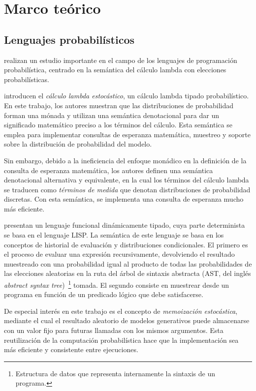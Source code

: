\chapter{Marco teórico}\label{sec:estado}

\section{Lenguajes probabilísticos}

\citet{zorzi} realizan un estudio importante en el campo de los lenguajes de programación probabilística, centrado en la semántica del cálculo lambda con elecciones probabilísticas.

\citet{slc} introducen el \emph{cálculo lambda estocástico}, un cálculo lambda tipado probabilístico. En este trabajo, los autores muestran que las distribuciones de probabilidad forman una mónada y utilizan una semántica denotacional para dar un significado matemático preciso a los términos del cálculo. Esta semántica se emplea para implementar consultas de esperanza matemática, muestreo y soporte sobre la distribución de probabilidad del modelo.



Sin embargo, debido a la ineficiencia del enfoque monádico en la definición de la consulta de esperanza matemática, los autores definen una semántica denotacional alternativa y equivalente, en la cual los términos del cálculo lambda se traducen como \emph{términos de medida} que denotan distribuciones de probabilidad discretas. Con esta semántica, se implementa una consulta de esperanza mucho más eficiente.

\citet{church} presentan un lenguaje funcional dinámicamente tipado, cuya parte determinista se basa en el lenguaje LISP. La semántica de este lenguaje se basa en los conceptos de historial de evaluación y distribuciones condicionales. El primero es el proceso de evaluar una expresión recursivamente, devolviendo el resultado muestreado con una probabilidad igual al producto de todas las probabilidades de las elecciones aleatorias en la ruta del árbol de sintaxis abstracta (AST, del inglés \emph{abstract syntax tree})~\footnote{Estructura de datos que representa internamente la sintaxis de un programa.}  tomada. El segundo consiste en muestrear desde un programa en función de un predicado lógico que debe satisfacerse.

De especial interés en este trabajo es el concepto de \emph{memoización estocástica}, mediante el cual el resultado aleatorio de modelos generativos puede almacenarse con un valor fijo para futuras llamadas con los mismos argumentos. Esta reutilización de la computación probabilística hace que la implementación sea más eficiente y consistente entre ejecuciones.


